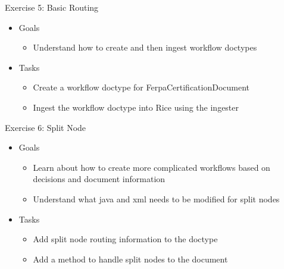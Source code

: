 \documentclass[xcolor=dvipsnames,14pt]{beamer}
\begin{document}
\begin{frame}{Exercise 5: Basic Routing}
	\begin{itemize}
		\item Goals
          \begin{itemize}
            \item Understand how to create and then ingest workflow doctypes
          \end{itemize}          
		\item Tasks
          \begin{itemize}
            \item Create a workflow doctype for FerpaCertificationDocument
            \item Ingest the workflow doctype into Rice using the ingester
          \end{itemize}          
	\end{itemize}
\end{frame}

\begin{frame}{Exercise 6: Split Node}
	\begin{itemize}
		\item Goals
          \begin{itemize}
            \item Learn about how to create more complicated workflows
              based on decisions and document information
            \item Understand what java and xml needs to be modified
              for split nodes
          \end{itemize}          
		\item Tasks
          \begin{itemize}
            \item Add split node routing information to the doctype
            \item Add a method to handle split nodes to the document
          \end{itemize}          
	\end{itemize}
\end{frame}
\end{document}
